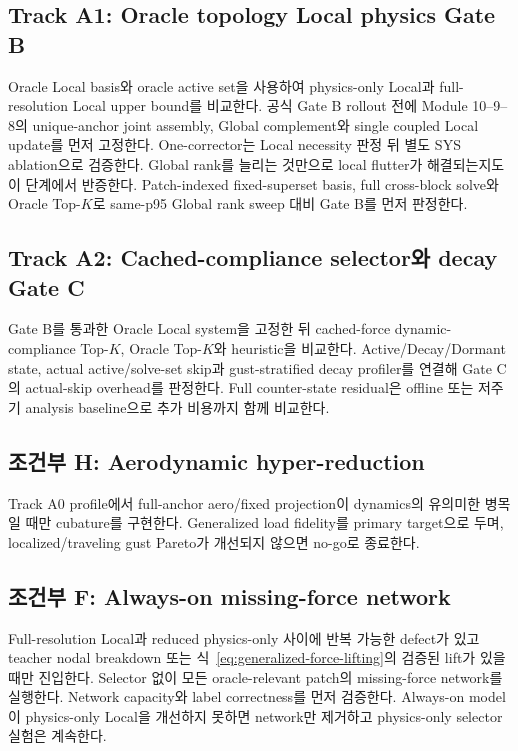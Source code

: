 \documentclass[11pt,a4paper]{article}
\begin{document}
\subsection{Track A1: Oracle topology Local physics Gate B}

Oracle Local basis와 oracle active set을 사용하여
physics-only Local과 full-resolution Local upper bound를 비교한다.
공식 Gate B rollout 전에 Module 10--9--8의 unique-anchor joint assembly,
Global complement와 single coupled Local update를 먼저 고정한다.
One-corrector는 Local necessity 판정 뒤 별도 SYS ablation으로 검증한다.
Global rank를 늘리는 것만으로 local flutter가 해결되는지도 이 단계에서 반증한다.
Patch-indexed fixed-superset basis, full cross-block solve와 Oracle Top-\(K\)로
same-p95 Global rank sweep 대비 Gate B를 먼저 판정한다.

\subsection{Track A2: Cached-compliance selector와 decay Gate C}

Gate B를 통과한 Oracle Local system을 고정한 뒤
cached-force dynamic-compliance Top-\(K\), Oracle Top-\(K\)와 heuristic을 비교한다.
Active/Decay/Dormant state, actual active/solve-set skip과 gust-stratified decay profiler를 연결해
Gate C의 actual-skip overhead를 판정한다.
Full counter-state residual은 offline 또는 저주기 analysis baseline으로 추가 비용까지 함께 비교한다.

\subsection{조건부 H: Aerodynamic hyper-reduction}

Track A0 profile에서 full-anchor aero/fixed projection이 dynamics의 유의미한 병목일 때만
cubature를 구현한다. Generalized load fidelity를 primary target으로 두며,
localized/traveling gust Pareto가 개선되지 않으면 no-go로 종료한다.

\subsection{조건부 F: Always-on missing-force network}

Full-resolution Local과 reduced physics-only 사이에 반복 가능한 defect가 있고
teacher nodal breakdown 또는 식~\eqref{eq:generalized-force-lifting}의 검증된 lift가 있을 때만 진입한다.
Selector 없이 모든 oracle-relevant patch의 missing-force network를 실행한다.
Network capacity와 label correctness를 먼저 검증한다.
Always-on model이 physics-only Local을 개선하지 못하면 network만 제거하고
physics-only selector 실험은 계속한다.
\end{document}
